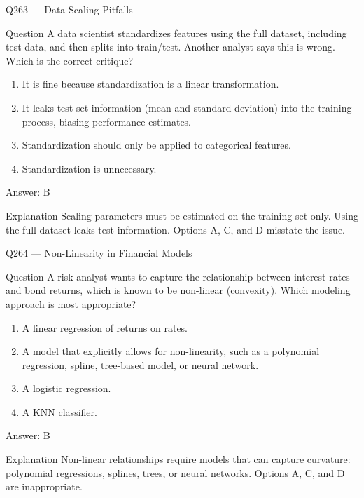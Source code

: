 \documentclass[aspectratio=169,8pt]{beamer}
\begin{document}
\begin{frame}{Q263 --- Data Scaling Pitfalls}
\begin{block}{Question}
A data scientist standardizes features using the full dataset, including test data, and then splits into train/test. Another analyst says this is wrong. Which is the correct critique?
\end{block}
\begin{enumerate}
\item It is fine because standardization is a linear transformation.
\item It leaks test-set information (mean and standard deviation) into the training process, biasing performance estimates.
\item Standardization should only be applied to categorical features.
\item Standardization is unnecessary.
\end{enumerate}
\begin{exampleblock}{Answer: B}\end{exampleblock}
\begin{block}{Explanation}
Scaling parameters must be estimated on the training set only. Using the full dataset leaks test information. Options A, C, and D misstate the issue.
\end{block}
\end{frame}

\begin{frame}{Q264 --- Non-Linearity in Financial Models}
\begin{block}{Question}
A risk analyst wants to capture the relationship between interest rates and bond returns, which is known to be non-linear (convexity). Which modeling approach is most appropriate?
\end{block}
\begin{enumerate}
\item A linear regression of returns on rates.
\item A model that explicitly allows for non-linearity, such as a polynomial regression, spline, tree-based model, or neural network.
\item A logistic regression.
\item A KNN classifier.
\end{enumerate}
\begin{exampleblock}{Answer: B}\end{exampleblock}
\begin{block}{Explanation}
Non-linear relationships require models that can capture curvature: polynomial regressions, splines, trees, or neural networks. Options A, C, and D are inappropriate.
\end{block}
\end{frame}
\end{document}
